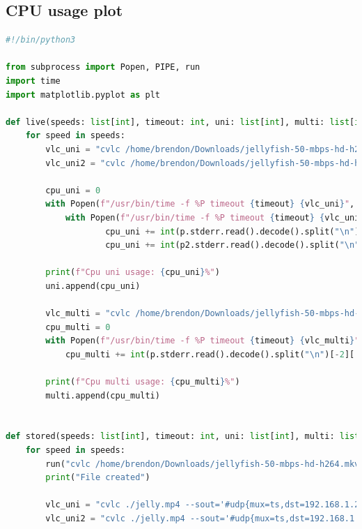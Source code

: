 \documentclass{exam}
\begin{document}
\subsection{CPU usage plot}
\begin{lstlisting}[language=python]
#!/bin/python3

from subprocess import Popen, PIPE, run
import time
import matplotlib.pyplot as plt

def live(speeds: list[int], timeout: int, uni: list[int], multi: list[int]):
    for speed in speeds:
        vlc_uni = "cvlc /home/brendon/Downloads/jellyfish-50-mbps-hd-h264.mkv --sout='#transcode{vcodec=h264,acodec=mpga,vb=" + str(speed) + ",ab=128}:udp{mux=ts,dst=192.168.1.247:1234}' --loop"
        vlc_uni2 = "cvlc /home/brendon/Downloads/jellyfish-50-mbps-hd-h264.mkv --sout='#transcode{vcodec=h264,acodec=mpga,vb=" + str(speed) + ",ab=128}:udp{mux=ts,dst=192.168.1.55:1235}' --loop"
        
        cpu_uni = 0
        with Popen(f"/usr/bin/time -f %P timeout {timeout} {vlc_uni}", stderr=PIPE, shell=True) as p:
            with Popen(f"/usr/bin/time -f %P timeout {timeout} {vlc_uni2}", stderr=PIPE, shell=True) as p2:
                    cpu_uni += int(p.stderr.read().decode().split("\n")[-2][:-1])
                    cpu_uni += int(p2.stderr.read().decode().split("\n")[-2][:-1])

        print(f"Cpu uni usage: {cpu_uni}%")
        uni.append(cpu_uni)

        vlc_multi = "cvlc /home/brendon/Downloads/jellyfish-50-mbps-hd-h264.mkv --sout='#transcode{vcodec=h264,acodec=mpga,vb=" + str(speed) + ",ab=128}:udp{mux=ts,dst=224.0.0.1,sdp=sap,name=\"TestStream\"}' --loop"
        cpu_multi = 0
        with Popen(f"/usr/bin/time -f %P timeout {timeout} {vlc_multi}", stderr=PIPE, shell=True) as p:
            cpu_multi += int(p.stderr.read().decode().split("\n")[-2][:-1])

        print(f"Cpu multi usage: {cpu_multi}%")
        multi.append(cpu_multi)
    

def stored(speeds: list[int], timeout: int, uni: list[int], multi: list[int]):
    for speed in speeds:
        run("cvlc /home/brendon/Downloads/jellyfish-50-mbps-hd-h264.mkv vlc://quit --sout='#transcode{vcodec=h264,acodec=mpga,vb=" + str(speed) + ",ab=128}:file{mux=mp4,dst=jelly.mp4}'", shell=True)
        print("File created")
        
        vlc_uni = "cvlc ./jelly.mp4 --sout='#udp{mux=ts,dst=192.168.1.247:1234}' --loop"
        vlc_uni2 = "cvlc ./jelly.mp4 --sout='#udp{mux=ts,dst=192.168.1.55:1235}' --loop"
        

\end{lstlisting}
\end{document}
